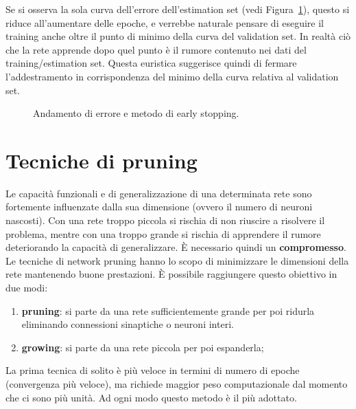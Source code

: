 Se si osserva la sola curva dell'errore dell’estimation set (vedi Figura~\ref{fig:overfit}), questo si riduce all’aumentare delle epoche, e verrebbe naturale pensare di eseguire il training anche oltre il punto di minimo della curva del validation set. In realtà ciò che la rete apprende dopo quel punto è il rumore contenuto nei dati del training/estimation set. Questa euristica suggerisce quindi di fermare l'addestramento in corrispondenza del minimo della curva relativa al validation set.
\begin{figure}[h!]
    \centering
    \caption{Andamento di errore e metodo di early stopping.}\label{fig:overfit}
\end{figure}




\newpage

\section{Tecniche di pruning} %
\label{sec:tecniche_di_pruning}
Le capacità funzionali e di generalizzazione di una determinata rete sono fortemente influenzate dalla sua dimensione (ovvero il numero di neuroni nascosti). Con una rete troppo piccola si rischia di non riuscire a risolvere il problema, mentre con una troppo grande si rischia di apprendere il rumore deteriorando la capacità di generalizzare. È necessario quindi un \textbf{compromesso}.\\

Le tecniche di network pruning hanno lo scopo di minimizzare le dimensioni della rete mantenendo buone prestazioni. È possibile raggiungere questo obiettivo in due modi:
\begin{enumerate}
    \item \textbf{pruning}: si parte da una rete sufficientemente grande per poi ridurla eliminando connessioni sinaptiche o neuroni interi.
    \item \textbf{growing}: si parte da una rete piccola per poi espanderla;
\end{enumerate}
La prima tecnica di solito è più veloce in termini di numero di epoche (convergenza più veloce), ma richiede maggior peso computazionale dal momento che ci sono più unità. Ad ogni modo questo metodo è il più adottato.\\

